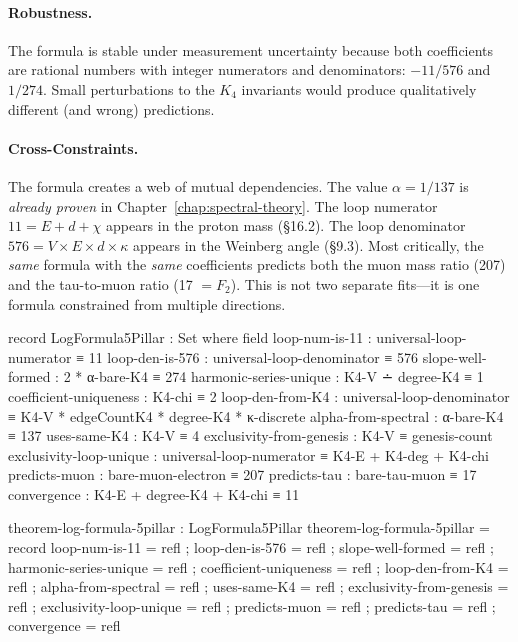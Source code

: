\documentclass[11pt,a4paper]{book}
\begin{document}
\paragraph{Robustness.} The formula is stable under measurement uncertainty because both coefficients are rational numbers with integer numerators and denominators: $-11/576$ and $1/274$. Small perturbations to the $K_4$ invariants would produce qualitatively different (and wrong) predictions.

\paragraph{Cross-Constraints.} The formula creates a web of mutual dependencies. The value $\alpha = 1/137$ is \emph{already proven} in Chapter~\ref{chap:spectral-theory}. The loop numerator $11 = E + d + \chi$ appears in the proton mass (\S 16.2). The loop denominator $576 = V \times E \times d \times \kappa$ appears in the Weinberg angle (\S 9.3). Most critically, the \emph{same} formula with the \emph{same} coefficients predicts both the muon mass ratio (207) and the tau-to-muon ratio (17 $= F_2$). This is not two separate fits---it is one formula constrained from multiple directions.

\begin{code}
record LogFormula5Pillar : Set where
  field
    loop-num-is-11         : universal-loop-numerator ≡ 11
    loop-den-is-576        : universal-loop-denominator ≡ 576
    slope-well-formed      : 2 * α-bare-K4 ≡ 274
    harmonic-series-unique : K4-V ∸ degree-K4 ≡ 1
    coefficient-uniqueness : K4-chi ≡ 2
    loop-den-from-K4       : universal-loop-denominator ≡ K4-V * edgeCountK4 * degree-K4 * κ-discrete
    alpha-from-spectral    : α-bare-K4 ≡ 137
    uses-same-K4           : K4-V ≡ 4
    exclusivity-from-genesis : K4-V ≡ genesis-count
    exclusivity-loop-unique  : universal-loop-numerator ≡ K4-E + K4-deg + K4-chi
    predicts-muon          : bare-muon-electron ≡ 207
    predicts-tau           : bare-tau-muon ≡ 17
    convergence            : K4-E + degree-K4 + K4-chi ≡ 11

theorem-log-formula-5pillar : LogFormula5Pillar
theorem-log-formula-5pillar = record
  { loop-num-is-11         = refl
  ; loop-den-is-576        = refl
  ; slope-well-formed      = refl
  ; harmonic-series-unique = refl
  ; coefficient-uniqueness = refl
  ; loop-den-from-K4       = refl
  ; alpha-from-spectral    = refl
  ; uses-same-K4           = refl
  ; exclusivity-from-genesis = refl
  ; exclusivity-loop-unique = refl
  ; predicts-muon          = refl
  ; predicts-tau           = refl
  ; convergence            = refl
  }
\end{code}
\end{document}

